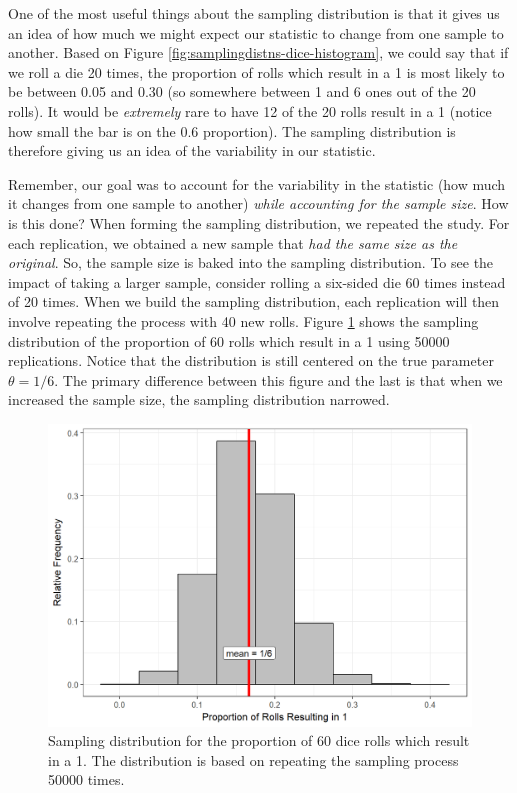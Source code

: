 \documentclass[]{book}
\theoremstyle{definition}
\theoremstyle{definition}
\theoremstyle{definition}
\theoremstyle{remark}
\begin{document}
One of the most useful things about the sampling distribution is that it
gives us an idea of how much we might expect our statistic to change
from one sample to another. Based on Figure
\ref{fig:samplingdistns-dice-histogram}, we could say that if we roll a
die 20 times, the proportion of rolls which result in a 1 is most likely
to be between 0.05 and 0.30 (so somewhere between 1 and 6 ones out of
the 20 rolls). It would be \emph{extremely} rare to have 12 of the 20
rolls result in a 1 (notice how small the bar is on the 0.6 proportion).
The sampling distribution is therefore giving us an idea of the
variability in our statistic.

Remember, our goal was to account for the variability in the statistic
(how much it changes from one sample to another) \emph{while accounting
for the sample size}. How is this done? When forming the sampling
distribution, we repeated the study. For each replication, we obtained a
new sample that \emph{had the same size as the original}. So, the sample
size is baked into the sampling distribution. To see the impact of
taking a larger sample, consider rolling a six-sided die 60 times
instead of 20 times. When we build the sampling distribution, each
replication will then involve repeating the process with 40 new rolls.
Figure \ref{fig:samplingdistns-dice-histogram2} shows the sampling
distribution of the proportion of 60 rolls which result in a 1 using
50000 replications. Notice that the distribution is still centered on
the true parameter \(\theta = 1/6\). The primary difference between this
figure and the last is that when we increased the sample size, the
sampling distribution narrowed.

\begin{figure}

{\centering \includegraphics[width=0.8\linewidth]{./Images/samplingdistns-dice-histogram2-1} 

}

\caption{Sampling distribution for the proportion of 60 dice rolls which result in a 1.  The distribution is based on repeating the sampling process 50000 times.}\label{fig:samplingdistns-dice-histogram2}
\end{figure}
\end{document}
